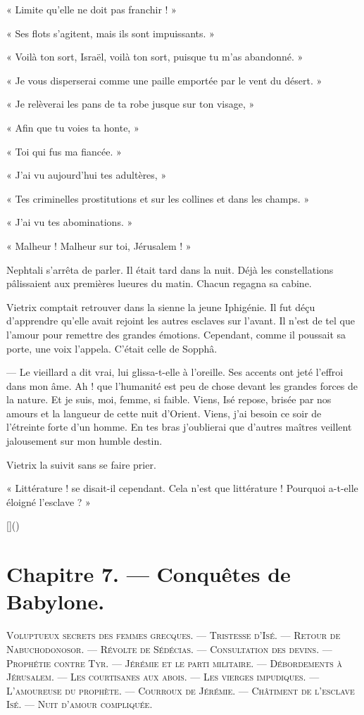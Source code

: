 \documentclass[a4paper, 11pt, oneside, polutonikogreek, french]{article}
\begin{document}
« Limite qu'elle ne doit pas franchir ! »

« Ses flots s'agitent, mais ils sont impuissants. »

« Voilà ton sort, Israël, voilà ton sort, puisque tu m'as abandonné. »

« Je vous disperserai comme une paille emportée par le vent du désert. »

« Je relèverai les pans de ta robe jusque sur ton visage, »

« Afin que tu voies ta honte, »

« Toi qui fus ma fiancée. »

« J'ai vu aujourd'hui tes adultères, »

« Tes criminelles prostitutions et sur les collines et dans les champs. »

« J'ai vu tes abominations. »

« Malheur ! Malheur sur toi, Jérusalem ! »

\bigskip
\centerline{\EightStarTaper}
\centerline{\EightStarTaper\EightStarTaper}
\bigskip

Nephtali s'arrêta de parler. Il était tard dans la nuit. Déjà les constellations pâlissaient aux premières lueures du matin. Chacun regagna sa cabine.

Vietrix comptait retrouver dans la sienne la jeune Iphigénie. Il fut déçu d'apprendre qu'elle avait rejoint les autres esclaves sur l'avant. Il n'est de tel que l'amour pour remettre des grandes émotions. Cependant, comme il poussait sa porte, une voix l'appela. C'était celle de Sopphâ.

--- Le vieillard a dit vrai, lui glissa-t-elle à l'oreille. Ses accents ont jeté l'effroi dans mon âme. Ah ! que l'humanité est peu de chose devant les grandes forces de la nature. Et je suis, moi, femme, si faible. Viens, Isé repose, brisée par nos amours et la langueur de cette nuit d'Orient. Viens, j'ai besoin ce soir de l'étreinte forte d'un homme. En tes bras j'oublierai que d'autres maîtres veillent jalousement sur mon humble destin.

Vietrix la suivit sans se faire prier.

« Littérature ! se disait-il cependant. Cela n'est que littérature ! Pourquoi a-t-elle éloigné l'esclave ? »

[]()
\clearpage
\section{Chapitre 7. --- Conquêtes de Babylone.}
\begin{center}
\scshape
\small
Voluptueux secrets des femmes grecques. --- Tristesse d'Isé. --- Retour de Nabuchodonosor. --- Révolte de Sédécias. --- Consultation des devins. --- Prophétie contre Tyr. --- Jérémie et le parti militaire. --- Débordements à Jérusalem. --- Les courtisanes aux abois. --- Les vierges impudiques. --- L'amoureuse du prophète. --- Courroux de Jérémie. --- Châtiment de l'esclave Isé. --- Nuit d'amour compliquée.
\end{center}
\end{document}
